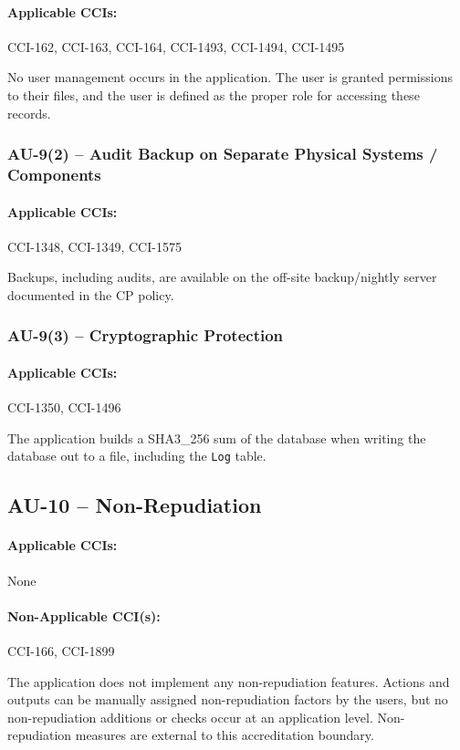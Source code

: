 \documentclass[letterpaper, 10pt, twoside]{article}
\begin{document}
\paragraph{Applicable CCIs:} CCI-162, CCI-163, CCI-164, CCI-1493, CCI-1494, CCI-1495

No user management occurs in the application. The user is granted permissions to their files, and the user is defined as the proper role for accessing these records.

\subsubsection{AU-9(2) -- Audit Backup on Separate Physical Systems / Components}

\paragraph{Applicable CCIs:} CCI-1348, CCI-1349, CCI-1575

Backups, including audits, are available on the off-site backup/nightly server documented in the CP policy.

\subsubsection{AU-9(3) -- Cryptographic Protection}

\paragraph{Applicable CCIs:} CCI-1350, CCI-1496

The application builds a SHA3\_256 sum of the database when writing the database out to a file, including the \texttt{Log} table.

\subsection{AU-10 -- Non-Repudiation}

\paragraph{Applicable CCIs:} None

\paragraph{Non-Applicable CCI(s):} CCI-166, CCI-1899

The application does not implement any non-repudiation features. Actions and outputs can be manually assigned non-repudiation factors by the users, but no non-repudiation additions or checks occur at an application level. Non-repudiation measures are external to this accreditation boundary.
\end{document}
